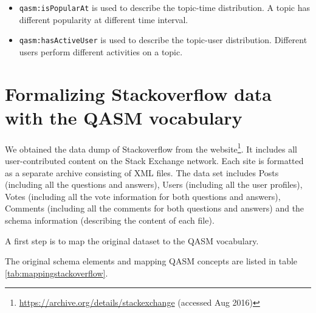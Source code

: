 \begin{itemize}
\item \texttt{qasm:isPopularAt} is used to describe the topic-time distribution. A topic has different popularity at different time interval.

\item \texttt{qasm:hasActiveUser} is used to describe the topic-user distribution. Different users perform different activities on a topic.
\end{itemize}





\section{Formalizing Stackoverflow data with the QASM vocabulary}


We obtained the data dump of Stackoverflow from the website\footnote{\url{https://archive.org/details/stackexchange} (accessed Aug 2016)}. It includes all user-contributed content on the Stack Exchange network. Each site is formatted as a separate archive consisting of XML files. The data set includes Posts (including all the questions and answers), Users (including all the user profiles), Votes (including all the vote information for both questions and answers), Comments (including all the comments for both questions and answers) and the schema information (describing the content of each file).

A first step is to map the original dataset to the QASM vocabulary. 



The original schema elements and mapping QASM concepts are listed in table \ref{tab:mappingstackoverflow}.

